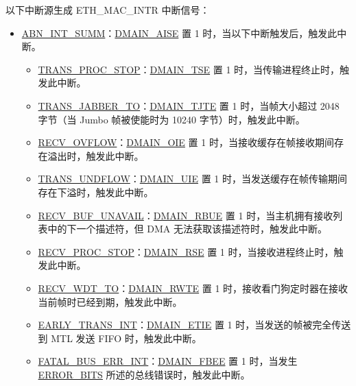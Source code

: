 \documentclass[main\_\_CN.tex]{subfiles}
\begin{document}
以下中断源生成 ETH\_MAC\_INTR 中断信号：
\begin{itemize}
\item \hyperref[regdesc:DMASTATUSREG]{ABN\_INT\_SUMM}：\hyperref[regdesc:DMAINENREG]{DMAIN\_AISE} 置 1 时，当以下中断触发后，触发此中断。
    \begin{itemize}
    \item \hyperref[regdesc:DMASTATUSREG]{TRANS\_PROC\_STOP}：\hyperref[regdesc:DMAINENREG]{DMAIN\_TSE} 置 1 时，当传输进程终止时，触发此中断。
    \item \hyperref[regdesc:DMASTATUSREG]{TRANS\_JABBER\_TO}：\hyperref[regdesc:DMAINENREG]{DMAIN\_TJTE} 置 1 时，当帧大小超过 2048 字节（当 Jumbo 帧被使能时为 10240 字节）时，触发此中断。
    \item \hyperref[regdesc:DMASTATUSREG]{RECV\_OVFLOW}：\hyperref[regdesc:DMAINENREG]{DMAIN\_OIE} 置 1 时，当接收缓存在帧接收期间存在溢出时，触发此中断。
    \item \hyperref[regdesc:DMASTATUSREG]{TRANS\_UNDFLOW}：\hyperref[regdesc:DMAINENREG]{DMAIN\_UIE} 置 1 时，当发送缓存在帧传输期间存在下溢时，触发此中断。
    \item \hyperref[regdesc:DMASTATUSREG]{RECV\_BUF\_UNAVAIL}：\hyperref[regdesc:DMAINENREG]{DMAIN\_RBUE} 置 1 时，当主机拥有接收列表中的下一个描述符，但 DMA 无法获取该描述符时，触发此中断。
    \item \hyperref[regdesc:DMASTATUSREG]{RECV\_PROC\_STOP}：\hyperref[regdesc:DMAINENREG]{DMAIN\_RSE} 置 1 时，当接收进程终止时，触发此中断。
    \item \hyperref[regdesc:DMASTATUSREG]{RECV\_WDT\_TO}：\hyperref[regdesc:DMAINENREG]{DMAIN\_RWTE} 置 1 时，接收看门狗定时器在接收当前帧时已经到期，触发此中断。
    \item \hyperref[regdesc:DMASTATUSREG]{EARLY\_TRANS\_INT}：\hyperref[regdesc:DMAINENREG]{DMAIN\_ETIE} 置 1 时，当发送的帧被完全传送到 MTL 发送 FIFO 时，触发此中断。
    \item \hyperref[regdesc:DMASTATUSREG]{FATAL\_BUS\_ERR\_INT}：\hyperref[regdesc:DMAINENREG]{DMAIN\_FBEE} 置 1 时，当发生 \hyperref[regdesc:DMAINENREG]{ERROR\_BITS} 所述的总线错误时，触发此中断。
    \end{itemize}


\end{itemize}
\end{document}
